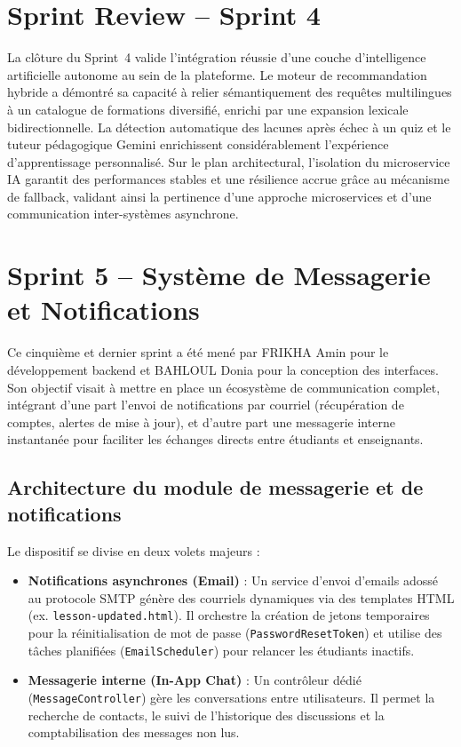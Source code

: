 \documentclass[12pt,a4paper]{report}
\begin{document}
\section{Sprint Review -- Sprint 4}

La clôture du Sprint~4 valide l'intégration réussie d'une couche d'intelligence artificielle autonome au sein de la plateforme. Le moteur de recommandation hybride a démontré sa capacité à relier sémantiquement des requêtes multilingues à un catalogue de formations diversifié, enrichi par une expansion lexicale bidirectionnelle. La détection automatique des lacunes après échec à un quiz et le tuteur pédagogique Gemini enrichissent considérablement l'expérience d'apprentissage personnalisé. Sur le plan architectural, l'isolation du microservice IA garantit des performances stables et une résilience accrue grâce au mécanisme de fallback, validant ainsi la pertinence d'une approche microservices et d'une communication inter-systèmes asynchrone.

\newpage

\section{Sprint 5 -- Système de Messagerie et Notifications}

Ce cinquième et dernier sprint a été mené par FRIKHA Amin pour le développement backend et BAHLOUL Donia pour la conception des interfaces. Son objectif visait à mettre en place un écosystème de communication complet, intégrant d'une part l'envoi de notifications par courriel (récupération de comptes, alertes de mise à jour), et d'autre part une messagerie interne instantanée pour faciliter les échanges directs entre étudiants et enseignants.

\subsection{Architecture du module de messagerie et de notifications}

Le dispositif se divise en deux volets majeurs :
\begin{itemize}
    \item \textbf{Notifications asynchrones (Email)} : Un service d'envoi d'emails adossé au protocole SMTP génère des courriels dynamiques via des templates HTML (ex. \texttt{lesson-updated.html}). Il orchestre la création de jetons temporaires pour la réinitialisation de mot de passe (\texttt{PasswordResetToken}) et utilise des tâches planifiées (\texttt{EmailScheduler}) pour relancer les étudiants inactifs.
    \item \textbf{Messagerie interne (In-App Chat)} : Un contrôleur dédié (\texttt{MessageController}) gère les conversations entre utilisateurs. Il permet la recherche de contacts, le suivi de l'historique des discussions et la comptabilisation des messages non lus.
\end{itemize}
\end{document}
